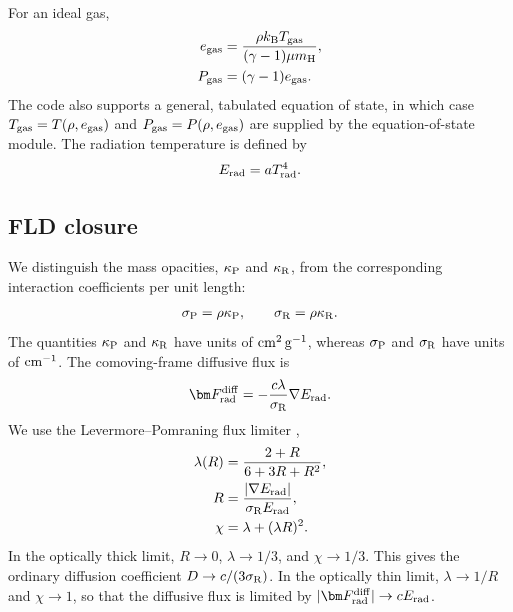 For an ideal gas,
\begin{align}
    e_{\rm gas}
    &=\frac{\rho k_{\rm B}T_{\rm gas}}
            {(\gamma-1)\mu m_{\rm H}},
    \label{eq:ideal_gas_internal_energy}\\
    P_{\rm gas}&=(\gamma-1)e_{\rm gas}.
    \label{eq:ideal_gas_pressure}
\end{align}
The code also supports a general, tabulated equation of state, in which case
$T_{\rm gas}=T(\rho,e_{\rm gas})$ and
$P_{\rm gas}=P(\rho,e_{\rm gas})$ are supplied by the equation-of-state
module.  The radiation temperature is defined by
\begin{align}
    E_{\rm rad}=aT_{\rm rad}^{4}.
    \label{eq:radiation_temperature}
\end{align}

\subsection{FLD closure}
\label{sec:fld_equations}

We distinguish the mass opacities, $\kappa_{\rm P}$ and $\kappa_{\rm R}$,
from the corresponding interaction coefficients per unit length:
\begin{align}
    \sigma_{\rm P}=\rho\kappa_{\rm P},
    \qquad
    \sigma_{\rm R}=\rho\kappa_{\rm R}.
    \label{eq:opacity_definitions}
\end{align}
The quantities $\kappa_{\rm P}$ and $\kappa_{\rm R}$ have units of
${\rm cm^2\,g^{-1}}$, whereas $\sigma_{\rm P}$ and $\sigma_{\rm R}$ have
units of ${\rm cm^{-1}}$.  The comoving-frame diffusive flux is
\begin{align}
    \bm F_{\rm rad}^{\rm diff}
    =-\frac{c\lambda}{\sigma_{\rm R}}\nabla E_{\rm rad}.
    \label{eq:fld_flux}
\end{align}
We use the Levermore--Pomraning flux limiter
\citep{Levermore1981-wp},
\begin{align}
    \lambda(R)&=\frac{2+R}{6+3R+R^2},
    \label{eq:flux_limiter}\\
    R&=\frac{|\nabla E_{\rm rad}|}
             {\sigma_{\rm R}E_{\rm rad}},
    \label{eq:flux_limiter_argument}\\
    \chi&=\lambda+(\lambda R)^2.
    \label{eq:eddington_factor}
\end{align}
In the optically thick limit, $R\rightarrow0$,
$\lambda\rightarrow1/3$, and $\chi\rightarrow1/3$.  This gives the ordinary
diffusion coefficient $D\rightarrow c/(3\sigma_{\rm R})$.  In the optically
thin limit, $\lambda\rightarrow1/R$ and $\chi\rightarrow1$, so that the
diffusive flux is limited by
$|\bm F_{\rm rad}^{\rm diff}|\rightarrow cE_{\rm rad}$.

